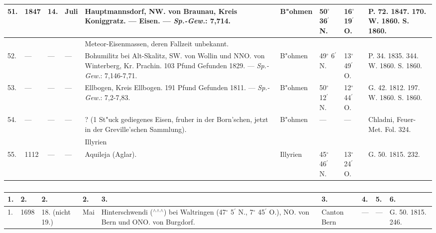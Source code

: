\documentclass[a4paper, 8pt, oneside, polutonikogreek, german]{article}
\begin{document}
\begin{center}
\begin{longtable}{|p{3mm}|p{10mm}|p{5mm}|p{13mm}|p{25mm}|p{13mm}|p{10mm}|p{10mm}|p{11mm}|}
        51. & 1847 & 14. & Juli & Hauptmannsdorf, NW. von Braunau, Kreis Koniggratz. --- Eisen. --- \emph{Sp.-Gew.}: 7,714. & B"ohmen & 50$^\circ$ 36$^\prime$ N. & 16$^\circ$ 19$^\prime$ O. & P. 72. 1847. 170. W. 1860. S. 1860. \\ \hline
          &   &   &   & Meteor-Eisenmassen, deren Fallzeit unbekannt. &   &   &   & ~ \\ \hline
        52. & --- & --- & --- & Bohumilitz bei Alt-Skalitz, SW. von Wollin und NNO. von Winterberg, Kr. Prachin. 103 Pfund Gefunden 1829. --- \emph{Sp.-Gew.}: 7,146-7,71. & B"ohmen & 49$^\circ$ 6$^\prime$ N. & 13$^\circ$ 49$^\prime$ O. & P. 34. 1835. 344. W. 1860. S. 1860. \\ \hline
        53. & --- & --- & --- & Ellbogen, Kreis Ellbogen. 191 Pfund Gefunden 1811. --- \emph{Sp.-Gew.}: 7,2-7,83. & B"ohmen & 50$^\circ$ 12$^\prime$ N. & 12$^\circ$ 44$^\prime$ O. & G. 42. 1812. 197. W. 1860. S. 1860. \\ \hline
        54. & --- & --- & --- & ? (1 St"uck gediegenes Eisen, fruher in der Born’schen, jetzt in der Greville’schen Sammlung). & B"ohmen & --- & --- & Chladni, Feuer-Met. Fol. 324. \\ \hline
         &   &   &  & Illyrien &   &   &   &   \\ \hline
        55. & 1112 & --- & --- & Aquileja (Aglar). & Illyrien & 45$^\circ$ 46$^\prime$ N. & 13$^\circ$ 24$^\prime$ O. & G. 50. 1815. 232. \\ \hline
    \end{longtable}
\end{center}
\subsubsection{}
\begin{table}[H]
    \footnotesize
    \swabfamily
    \begin{longtable}{|p{3mm}|p{10mm}|p{5mm}|p{13mm}|p{25mm}|p{13mm}|p{10mm}|p{10mm}|p{11mm}|}
    \hline
        1. & 2. & 2. & 2. & 3. & 3. & 4. & 5. & 6. \\ \hline
        1. & 1698 & 18. (nicht 19.) & Mai & Hinterschwendi ($^\wedge$$^\wedge$$^\wedge$) bei Waltringen (47$^\circ$ 5$^\prime$ N., 7$^\circ$ 45$^\prime$ O.), NO. von Bern und ONO. von Burgdorf. & Canton Bern & --- & --- & G. 50. 1815. 246. \\ \hline
    \end{longtable}
\end{table}
\end{document}
